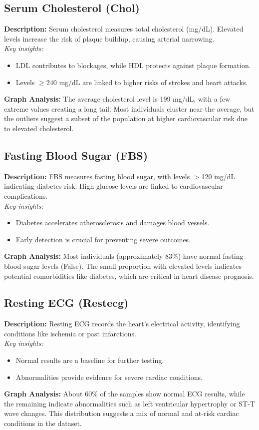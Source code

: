 \documentclass[pdflatex,sn-nature,Numbered]{sn-jnl}%
\theoremstyle{thmstyleone}%
\theoremstyle{thmstyletwo}%
\theoremstyle{thmstylethree}%
\begin{document}
\subsection{Serum Cholesterol (Chol)}
\textbf{Description:} 
Serum cholesterol measures total cholesterol (mg/dL). Elevated levels increase the risk of plaque buildup, causing arterial narrowing. \\
\textit{Key insights:}
\begin{itemize}
    \item LDL contributes to blockages, while HDL protects against plaque formation.
    \item Levels $\geq$240 mg/dL are linked to higher risks of strokes and heart attacks.
\end{itemize}
\textbf{Graph Analysis:} 
The average cholesterol level is 199 mg/dL, with a few extreme values creating a long tail. Most individuals cluster near the average, but the outliers suggest a subset of the population at higher cardiovascular risk due to elevated cholesterol.

\subsection{Fasting Blood Sugar (FBS)}
\textbf{Description:} 
FBS measures fasting blood sugar, with levels $>$120 mg/dL indicating diabetes risk. High glucose levels are linked to cardiovascular complications. \\
\textit{Key insights:}
\begin{itemize}
    \item Diabetes accelerates atherosclerosis and damages blood vessels.
    \item Early detection is crucial for preventing severe outcomes.
\end{itemize}
\textbf{Graph Analysis:} 
Most individuals (approximately 83\%) have normal fasting blood sugar levels (False). The small proportion with elevated levels indicates potential comorbidities like diabetes, which are critical in heart disease prognosis.

\subsection{Resting ECG (Restecg)}
\textbf{Description:} 
Resting ECG records the heart's electrical activity, identifying conditions like ischemia or past infarctions. \\
\textit{Key insights:}
\begin{itemize}
    \item Normal results are a baseline for further testing.
    \item Abnormalities provide evidence for severe cardiac conditions.
\end{itemize}
\textbf{Graph Analysis:} 
About 60\% of the samples show normal ECG results, while the remaining indicate abnormalities such as left ventricular hypertrophy or ST-T wave changes. This distribution suggests a mix of normal and at-risk cardiac conditions in the dataset.
\end{document}
